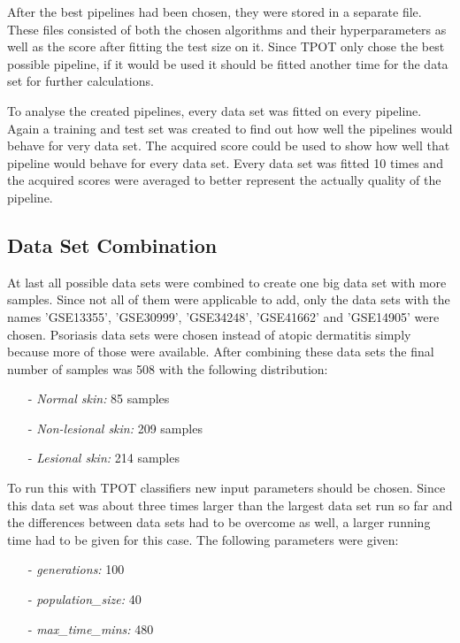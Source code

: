 \documentclass[10pt,a4paper]{article}
\begin{document}
	After the best pipelines had been chosen, they were stored in a separate file. These files consisted of both the chosen algorithms and their hyperparameters as well as the score after fitting the test size on it. Since TPOT only chose the best possible pipeline, if it would be used it should be fitted another time for the data set for further calculations.
		
	To analyse the created pipelines, every data set was fitted on every pipeline. Again a training and test set was created to find out how well the pipelines would behave for very data set. The acquired score could be used to show how well that pipeline would behave for every data set. Every data set was fitted 10 times and the acquired scores were averaged to better represent the actually quality of the pipeline.
	
	\subsection{Data Set Combination}
	\label{subsec:MethodsDataSetCombination}
	
	At last all possible data sets were combined to create one big data set with more samples. Since not all of them were applicable to add, only the data sets with the names 'GSE13355', 'GSE30999', 'GSE34248', 'GSE41662' and 'GSE14905' were chosen. Psoriasis data sets were chosen instead of atopic dermatitis simply because more of those were available. After combining these data sets the final number of samples was 508 with the following distribution:
	
	\begin{enumerate}
		\item[-] \textit{Normal skin:} 85 samples
		\item[-] \textit{Non-lesional skin:} 209 samples
		\item[-] \textit{Lesional skin:} 214 samples
	\end{enumerate}

	To run this with TPOT classifiers new input parameters should be chosen. Since this data set was about three times larger than the largest data set run so far and the differences between data sets had to be overcome as well, a larger running time had to be given for this case. The following parameters were given:
	
	 \begin{enumerate}
		\item[-] \textit{generations:} 100
		\item[-] \textit{population\_size:} 40
		\item[-] \textit{max\_time\_mins:} 480 
	\end{enumerate}
\end{document}

